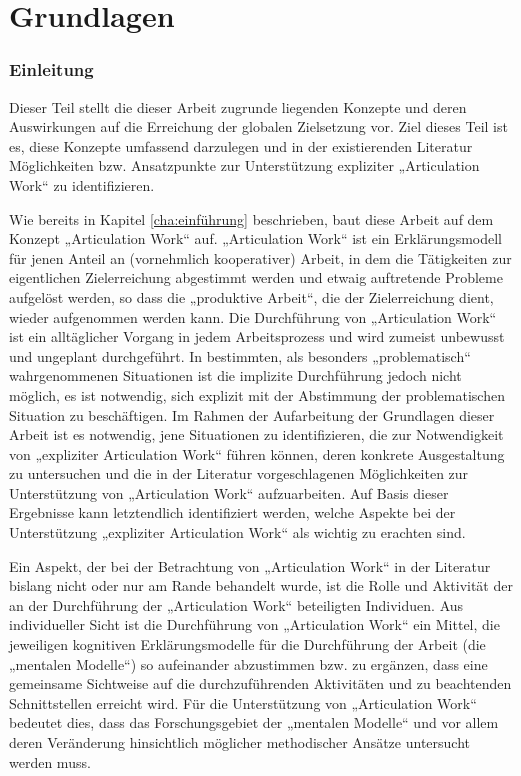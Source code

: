 \part{Grundlagen} %
\label{prt:grundlagen}

\section*{Einleitung} %
\label{sec:grundlagen_einleitung}
\thispagestyle{empty}

Dieser Teil stellt die dieser Arbeit zugrunde liegenden Konzepte und deren Auswirkungen auf die Erreichung der globalen Zielsetzung vor. Ziel dieses Teil ist es, diese Konzepte umfassend darzulegen und in der existierenden Literatur Möglichkeiten bzw. Ansatzpunkte zur Unterstützung expliziter „Articulation Work“ zu identifizieren.

Wie bereits in Kapitel \ref{cha:einführung} beschrieben, baut diese Arbeit auf dem Konzept „Articulation Work“ auf. „Articulation Work“ ist ein Erklärungsmodell für jenen Anteil an (vornehmlich kooperativer) Arbeit, in dem die Tätigkeiten zur eigentlichen Zielerreichung abgestimmt werden und etwaig auftretende Probleme aufgelöst werden, so dass die „produktive Arbeit“, die der Zielerreichung dient, wieder aufgenommen werden kann. Die Durchführung von „Articulation Work“ ist ein alltäglicher Vorgang in jedem Arbeitsprozess und wird zumeist unbewusst und ungeplant durchgeführt. In bestimmten, als besonders „problematisch“ wahrgenommenen Situationen ist die implizite Durchführung jedoch nicht  möglich, es ist notwendig, sich explizit mit der Abstimmung der problematischen Situation zu beschäftigen. Im Rahmen der Aufarbeitung der Grundlagen dieser Arbeit ist es notwendig, jene Situationen zu identifizieren, die zur Notwendigkeit von „expliziter Articulation Work“ führen können, deren konkrete Ausgestaltung zu untersuchen und die in der Literatur vorgeschlagenen Möglichkeiten zur Unterstützung von „Articulation Work“ aufzuarbeiten. Auf Basis dieser Ergebnisse kann letztendlich identifiziert werden, welche Aspekte bei der Unterstützung „expliziter Articulation Work“ als wichtig zu erachten sind.

Ein Aspekt, der bei der Betrachtung von „Articulation Work“ in der Literatur bislang nicht oder nur am Rande behandelt wurde, ist die Rolle und Aktivität der an der Durchführung der „Articulation Work“ beteiligten Individuen. Aus individueller Sicht ist die Durchführung von „Articulation Work“ ein Mittel, die jeweiligen kognitiven Erklärungsmodelle für die Durchführung der Arbeit (die „mentalen Modelle“) so aufeinander abzustimmen bzw. zu ergänzen, dass eine gemeinsame Sichtweise auf die durchzuführenden Aktivitäten und zu beachtenden Schnittstellen erreicht wird. Für die Unterstützung von „Articulation Work“ bedeutet dies, dass das Forschungsgebiet der „mentalen Modelle“ und vor allem deren Veränderung hinsichtlich möglicher methodischer Ansätze untersucht werden muss.

